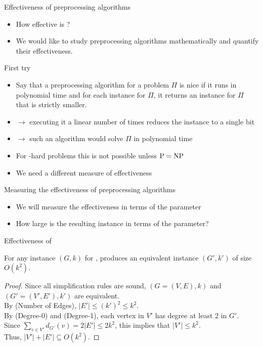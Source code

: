 \begin{frame}{Effectiveness of preprocessing algorithms}

	\begin{itemize}
		\item How effective is \vcpre?
		\item We would like to study preprocessing algorithms mathematically and quantify their effectiveness.
	\end{itemize}

\end{frame}


\begin{frame}{First try}

	\begin{itemize}
		\item Say that a preprocessing algorithm for a problem $\Pi$ is \alert{nice}
		      if it runs in polynomial time and
		      for each instance for $\Pi$, it returns an instance for $\Pi$ that is strictly smaller.
		      \pause
		\item $\rightarrow$ executing it a linear number of times reduces the instance to a single bit
		\item $\rightarrow$ such an algorithm would solve $\Pi$ in polynomial time
		\item For \NP-hard problems this is not possible unless $\text{\normalfont {P}} = \text{\normalfont {NP}}$
		\item We need a different measure of effectiveness
	\end{itemize}

\end{frame}


\begin{frame}{Measuring the effectiveness of preprocessing algorithms}
	\begin{itemize}
		\item We will measure the effectiveness in terms of the \alert{parameter}
		\item How large is the resulting instance in terms of the parameter?
	\end{itemize}
\end{frame}


\begin{frame}{Effectiveness of \vcpre}
	\begin{lemma}
		For any instance $(G,k)$ for \VC, \vcpre produces an equivalent instance $(G',k')$ of size $O(k^2)$.
	\end{lemma}
	\begin{proof}
		Since all simplification rules are sound, $(G=(V,E),k)$ and $(G'=(V',E'),k')$ are equivalent.\\
		By (Number of Edges), $|E'|\le (k')^2 \le k^2$.\\
		By (Degree-0) and (Degree-1), each vertex in $V'$ has degree at least 2 in $G'$.\\
		Since $\sum_{v\in V'} d_{G'}(v) = 2 |E'| \le 2k^2$, this implies that $|V'|\le k^2$.\\
		Thus, $|V'|+|E'| \subseteq O(k^2)$.
	\end{proof}
\end{frame}

